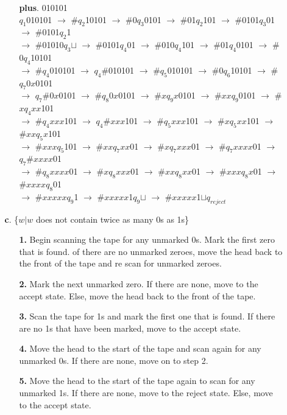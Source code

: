 \documentclass[12pt]{letter}
\begin{document}
\begin{enumerate}
\begin{enumerate}
\begin{enumerate}
	\item[\textbf{plus}.] 010101 \\
		$q_1$010101 $\rightarrow$ $\#$$q_2$10101 $\rightarrow$ $\#$0$q_3$0101 $\rightarrow$ $\#$01$q_2$101 $\rightarrow$ $\#$0101$q_3$01 $\rightarrow$ $\#$0101$q_2$1\\
		$\rightarrow$ $\#$01010$q_3$$\sqcup$ $\rightarrow$ $\#$0101$q_4$01 $\rightarrow$ $\#$010$q_4$101 $\rightarrow$ $\#$01$q_4$0101 $\rightarrow$ $\#$0$q_4$10101 \\
		$\rightarrow$ $\#$$q_4$010101 $\rightarrow$ $q_4$$\#$010101 $\rightarrow$ $\#$$q_5$010101 $\rightarrow$ $\#$0$q_6$10101 $\rightarrow$ $\#$$q_7$0$x$0101 \\
		$\rightarrow$ $q_7$$\#$0$x$0101 $\rightarrow$ $\#$$q_8$0$x$0101 $\rightarrow$ $\#$$x$$q_9$$x$0101 $\rightarrow$ $\#$$xx$$q_9$0101 $\rightarrow$ $\#$$x$$q_4$$xx$101\\
		 $\rightarrow$ $\#$$q_4$$xxx$101 $\rightarrow$ $q_4$$\#$$xxx$101 $\rightarrow$ $\#$$q_5$$xxx$101 $\rightarrow$ $\#$$x$$q_5$$xx$101 $\rightarrow$ $\#$$xx$$q_5$$x$101\\
		  $\rightarrow$ $\#$$xxx$$q_5$101 $\rightarrow$ $\#$$xx$$q_7$$xx$01 $\rightarrow$ $\#$$x$$q_7$$xxx$01 $\rightarrow$ $\#$$q_7$$xxxx$01 $\rightarrow$ $q_7$$\#$$xxxx$01 \\
		  $\rightarrow$ $\#$$q_8$$xxxx$01 $\rightarrow$ $\#$$x$$q_8$$xxx$01 $\rightarrow$ $\#$$xx$$q_8$$xx$01 $\rightarrow$ $\#$$xxx$$q_8$$x$01 $\rightarrow$ $\#$$xxxx$$q_8$01 \\
		  $\rightarrow$ $\#$$xxxxx$$q_9$1 $\rightarrow$ $\#$$xxxxx$1$q_9$$\sqcup$ $\rightarrow$ $\#$$xxxxx$1$\sqcup$$q_{reject}$\\
	\end{enumerate}

	\item[\textbf{c}.] \{$w| w$ does not contain twice as many 0s as 1s\} \\
	\begin{enumerate}
		\item[\textbf{1.}] Begin scanning the tape for any unmarked 0s. Mark the first zero that is found. of there are no unmarked zeroes, move the head back to the front of the tape and re scan for unmarked zeroes.
		\item[\textbf{2.}] Mark the next unmarked zero. If there are none, move to the accept state. Else, move the head back to the front of the tape. 
		\item[\textbf{3.}] Scan the tape for 1s and mark the first one that is found. If there are no 1s that have been marked, move to the accept state.
		\item[\textbf{4.}] Move the head to the start of the tape and scan again for any unmarked 0s. If there are none, move on to step 2.
		\item[\textbf{5.}] Move the head to the start of the tape again to scan for any unmarked 1s. If there are none, move to the reject state. Else, move to the accept state. 


\end{enumerate}
\end{enumerate}
\end{enumerate}
\end{document}
